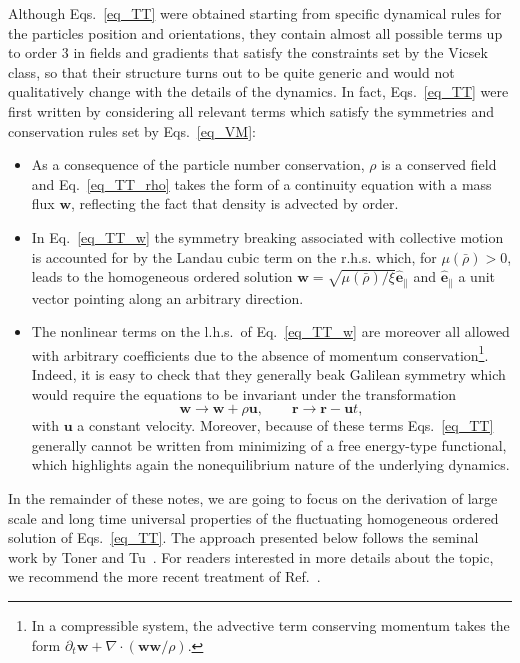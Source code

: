 Although Eqs.~\eqref{eq_TT} were obtained starting from specific dynamical rules for the particles position and orientations, 
they contain almost all possible terms up to order 3 in fields and gradients that satisfy the constraints set by the Vicsek class,
so that their structure turns out to be quite generic and would not qualitatively change with the details of the dynamics.
In fact, Eqs.~\eqref{eq_TT} were first written by considering all relevant terms which satisfy the symmetries and conservation rules 
set by Eqs.~\eqref{eq_VM}:
\begin{itemize}
\item As a consequence of the particle number conservation, $\rho$ is a conserved field and Eq.~\eqref{eq_TT_rho} takes the form of a continuity equation with a mass flux $\bm w$, reflecting the fact that density is advected by order.
\item In Eq.~\eqref{eq_TT_w} the symmetry breaking associated with collective motion is accounted for by the Landau cubic term on the r.h.s. which, for $\mu(\bar{\rho}) > 0$, leads to the homogeneous ordered solution $\bm w = \sqrt{\mu(\bar{\rho}) / \xi} \hat{\bm e}_\|$ and $\hat{\bm e}_\|$ a unit vector pointing along an arbitrary direction.
\item The nonlinear terms on the l.h.s.\ of Eq.~\eqref{eq_TT_w} are moreover all allowed with arbitrary coefficients due to the absence 
of momentum conservation\footnote{In a compressible system, the advective term conserving momentum takes the form $\partial_t \bm w + \nabla \cdot (\bm w \bm w / \rho)$.}. 
Indeed, it is easy to check that they generally beak Galilean symmetry which would require the equations to be invariant under the transformation
\begin{equation*}
\bm w \to \bm w + \rho \bm u , \qquad \bm r \to \bm r - \bm u t ,
\end{equation*}
with $\bm u$ a constant velocity.
Moreover, because of these terms Eqs.~\eqref{eq_TT} generally cannot be written from minimizing of a free energy-type functional,
which highlights again the nonequilibrium nature of the underlying dynamics.
\end{itemize}


In the remainder of these notes, we are going to focus on the derivation of large scale and long time universal properties of the fluctuating homogeneous ordered solution of Eqs.~\eqref{eq_TT}.
The approach presented below follows the seminal work by Toner and Tu~\cite{toner1995long,toner2012reanalysis}.
For readers interested in more details about the topic, we recommend the more recent treatment of Ref.~\cite{chate2024dynamic}.


